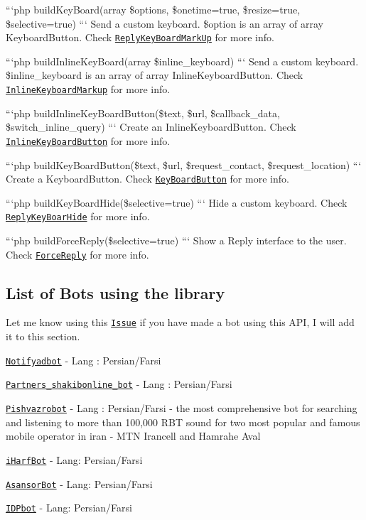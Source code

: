 ```php build\-Key\-Board(array \$options, \$onetime=true, \$resize=true, \$selective=true) ``` Send a custom keyboard. \$option is an array of array Keyboard\-Button. Check \href{https://core.telegram.org/bots/api#replykeyboardmarkup}{\tt Reply\-Key\-Board\-Mark\-Up} for more info.

```php build\-Inline\-Key\-Board(array \$inline\-\_\-keyboard) ``` Send a custom keyboard. \$inline\-\_\-keyboard is an array of array Inline\-Keyboard\-Button. Check \href{https://core.telegram.org/bots/api#inlinekeyboardmarkup}{\tt Inline\-Keyboard\-Markup} for more info.

```php build\-Inline\-Key\-Board\-Button(\$text, \$url, \$callback\-\_\-data, \$switch\-\_\-inline\-\_\-query) ``` Create an Inline\-Keyboard\-Button. Check \href{https://core.telegram.org/bots/api#inlinekeyboardbutton}{\tt Inline\-Key\-Board\-Button} for more info.

```php build\-Key\-Board\-Button(\$text, \$url, \$request\-\_\-contact, \$request\-\_\-location) ``` Create a Keyboard\-Button. Check \href{https://core.telegram.org/bots/api#keyboardbutton}{\tt Key\-Board\-Button} for more info.

```php build\-Key\-Board\-Hide(\$selective=true) ``` Hide a custom keyboard. Check \href{https://core.telegram.org/bots/api#replykeyboardhide}{\tt Reply\-Key\-Boar\-Hide} for more info.

```php build\-Force\-Reply(\$selective=true) ``` Show a Reply interface to the user. Check \href{https://core.telegram.org/bots/api#forcereply}{\tt Force\-Reply} for more info.

\subsection*{List of Bots using the library }

Let me know using this \href{https://github.com/Eleirbag89/TelegramBotPHP/issues/80}{\tt Issue} if you have made a bot using this A\-P\-I, I will add it to this section.
\begin{DoxyItemize}
\item \href{https://telegram.me/notifyadbot}{\tt Notifyadbot} -\/ Lang \-: Persian/\-Farsi
\item \href{https://telegram.me/Partners_shakibonline_bot}{\tt Partners\-\_\-shakibonline\-\_\-bot} -\/ Lang \-: Persian/\-Farsi
\item \href{https://t.me/pishvazrobot}{\tt Pishvazrobot} -\/ Lang \-: Persian/\-Farsi -\/ the most comprehensive bot for searching and listening to more than 100,000 R\-B\-T sound for two most popular and famous mobile operator in iran -\/ M\-T\-N Irancell and Hamrahe Aval
\item \href{https://t.me/iHarfBot}{\tt i\-Harf\-Bot} -\/ Lang\-: Persian/\-Farsi
\item \href{https://t.me/AsansorBot}{\tt Asansor\-Bot} -\/ Lang\-: Persian/\-Farsi
\item \href{https://t.me/IDPbot}{\tt I\-D\-Pbot} -\/ Lang\-: Persian/\-Farsi
\end{DoxyItemize}

